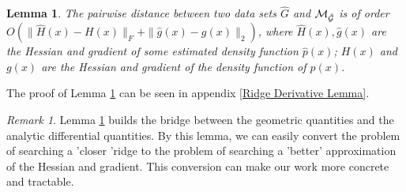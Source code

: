 \documentclass[aos,preprint]{imsart}
\newtheorem{lemma}[theorem]{Lemma}
\theoremstyle{remark}
\newtheorem*{remark}{Remark}
\begin{document}
\begin{lemma}{ 
The pairwise distance between two data sets $\hat{G}$ and $\cal M_{\hat{G}}$ is of order $O(\|\hat{H}(x)-H(x)\|_F+\|\hat{g}(x)-g(x)\|_2)$, where $\hat{H}(x), \hat{g}(x)$ are the Hessian and gradient of some estimated density function $\hat{p}(x)$; $H(x)$ and $g(x)$ are the Hessian and gradient of the density function of $p(x)$.
 }\label{margin}
\end{lemma}
The proof of Lemma \ref{margin} can be seen in appendix \ref{Ridge Derivative Lemma}.
\begin{remark}
Lemma \ref{margin} builds the bridge between the geometric quantities and the analytic differential quantities. By this lemma, we can easily convert the problem of searching a 'closer 'ridge to the problem of searching a 'better' approximation of the Hessian and gradient. This conversion can make our work more concrete and tractable.
\end{remark}
\end{document}
